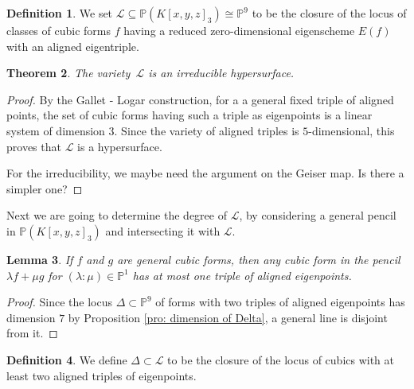 \documentclass{amsart}
\theoremstyle{plain}
\newtheorem{theorem}{Theorem}
\newtheorem{lem}[theorem]{Lemma}
\theoremstyle{definition}
\newtheorem{definition}[theorem]{Definition}
\newcommand{\p}{\mathbb{P}}
\newcommand{\sL}{\mathcal{L}}
\begin{document}
\begin{definition}
 We set $\mathcal{L} \subseteq \p(K[x,y,z]_3) \cong \p^9$ to be the closure of the locus of classes of cubic forms $f$ having a reduced zero-dimensional eigenscheme $E(f)$ with an aligned eigentriple.
\end{definition}


\begin{theorem}
The variety~$\mathcal{L}$ is an irreducible hypersurface.
\end{theorem}

\begin{proof}
By the Gallet - Logar construction, for a a general fixed triple of aligned points, the set of cubic forms having such a triple as eigenpoints is a linear system of dimension $3$. Since the variety of aligned triples is $5$-dimensional, this proves that $\mathcal{L}$ is a hypersurface.

For the irreducibility, we maybe need the argument on the Geiser map. Is there a simpler one?
\end{proof}

Next we are going to determine the degree of $\sL$, by considering a general pencil in $\p(K[x,y,z]_3)$
and intersecting it with $\sL$. 
\begin{lem}
\label{lem:pencil_one_aligned}
 If $f$ and $g$ are general cubic forms, then any cubic form in the pencil $\lambda f + \mu g$ for $(\lambda: \mu) \in \p^1$ has at most one triple of aligned eigenpoints.
\end{lem}

\begin{proof}
Since the locus $\Delta \subset \p^9$ of forms with two triples of aligned eigenpoints has dimension $7$ by Proposition \ref{pro: dimension of Delta}, a general line is disjoint from it.
\end{proof}
\begin{definition}
 We define $\Delta \subset \mathcal{L}$ to be the closure of the locus of cubics with at least two aligned triples of eigenpoints.
\end{definition}
\end{document}
